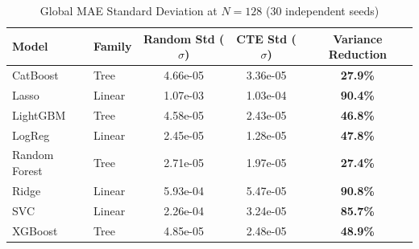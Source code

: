 \begin{table}[h!]
\centering
\caption{Global MAE Standard Deviation at $N=128$ (30 independent seeds)}
\label{tab:variance_reduction}
\begin{tabular}{llccc}
\toprule
\textbf{Model} & \textbf{Family} & \textbf{Random Std ($\sigma$)} & \textbf{CTE Std ($\sigma$)} & \textbf{Variance Reduction} \\
\midrule
CatBoost & Tree & 4.66e-05 & 3.36e-05 & \textbf{27.9\%} \\
Lasso & Linear & 1.07e-03 & 1.03e-04 & \textbf{90.4\%} \\
LightGBM & Tree & 4.58e-05 & 2.43e-05 & \textbf{46.8\%} \\
LogReg & Linear & 2.45e-05 & 1.28e-05 & \textbf{47.8\%} \\
Random Forest & Tree & 2.71e-05 & 1.97e-05 & \textbf{27.4\%} \\
Ridge & Linear & 5.93e-04 & 5.47e-05 & \textbf{90.8\%} \\
SVC & Linear & 2.26e-04 & 3.24e-05 & \textbf{85.7\%} \\
XGBoost & Tree & 4.85e-05 & 2.48e-05 & \textbf{48.9\%} \\
\bottomrule
\end{tabular}
\end{table}
